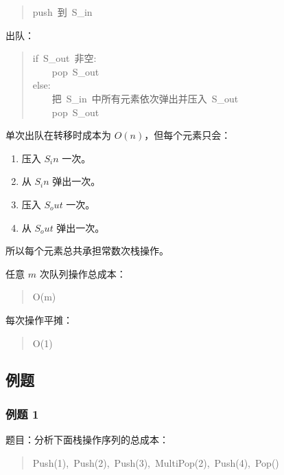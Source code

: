 \documentclass[UTF8,zihao=-4]{ctexart}
\begin{document}
\begin{quote}
\small\ttfamily\raggedright
\relax push\ 到\ S\_in\\
\end{quote}

出队：

\begin{quote}
\small\ttfamily\raggedright
\relax if\ S\_out\ 非空:\\
\relax \ \ \ \ pop\ S\_out\\
\relax else:\\
\relax \ \ \ \ 把\ S\_in\ 中所有元素依次弹出并压入\ S\_out\\
\relax \ \ \ \ pop\ S\_out\\
\end{quote}

单次出队在转移时成本为 $O(n)$，但每个元素只会：

\begin{enumerate}
\item 压入 $S_in$ 一次。
\item 从 $S_in$ 弹出一次。
\item 压入 $S_out$ 一次。
\item 从 $S_out$ 弹出一次。
\end{enumerate}

所以每个元素总共承担常数次栈操作。

任意 $m$ 次队列操作总成本：

\begin{quote}
\small\ttfamily\raggedright
\relax O(m)\\
\end{quote}

每次操作平摊：

\begin{quote}
\small\ttfamily\raggedright
\relax O(1)\\
\end{quote}

\subsection*{例题}

\subsubsection*{例题 1}

题目：分析下面栈操作序列的总成本：

\begin{quote}
\small\ttfamily\raggedright
\relax Push(1),\ Push(2),\ Push(3),\ MultiPop(2),\ Push(4),\ Pop()\\
\end{quote}
\end{document}
